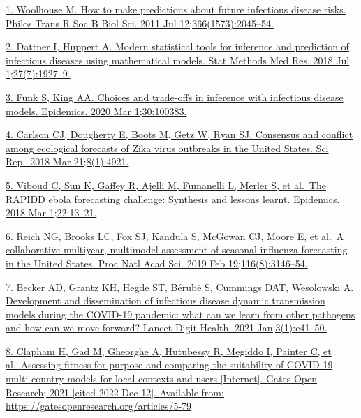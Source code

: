 \documentclass[
  letterpaper,
  DIV=11,
  numbers=noendperiod]{scrartcl}
\begin{document}
\begin{tcolorbox}[enhanced jigsaw, title=\textcolor{quarto-callout-caution-color}{\faFire}\hspace{0.5em}{Caution}, coltitle=black, colback=white, left=2mm, colbacktitle=quarto-callout-caution-color!10!white, breakable, bottomrule=.15mm, titlerule=0mm, opacityback=0, toprule=.15mm, rightrule=.15mm, arc=.35mm, toptitle=1mm, leftrule=.75mm, bottomtitle=1mm, opacitybacktitle=0.6, colframe=quarto-callout-caution-color-frame]

\href{https://www.zotero.org/google-docs/?7SKDbN}{1. Woolhouse M. How to
make predictions about future infectious disease risks. Philos Trans R
Soc B Biol Sci. 2011 Jul 12;366(1573):2045--54.}

\href{https://www.zotero.org/google-docs/?7SKDbN}{2. Dattner I, Huppert
A. Modern statistical tools for inference and prediction of infectious
diseases using mathematical models. Stat Methods Med Res. 2018 Jul
1;27(7):1927--9.}

\href{https://www.zotero.org/google-docs/?7SKDbN}{3. Funk S, King AA.
Choices and trade-offs in inference with infectious disease models.
Epidemics. 2020 Mar 1;30:100383.}

\href{https://www.zotero.org/google-docs/?7SKDbN}{4. Carlson CJ,
Dougherty E, Boots M, Getz W, Ryan SJ. Consensus and conflict among
ecological forecasts of Zika virus outbreaks in the United States. Sci
Rep.~2018 Mar 21;8(1):4921.}

\href{https://www.zotero.org/google-docs/?7SKDbN}{5. Viboud C, Sun K,
Gaffey R, Ajelli M, Fumanelli L, Merler S, et al.~The RAPIDD ebola
forecasting challenge: Synthesis and lessons learnt. Epidemics. 2018 Mar
1;22:13--21.}

\href{https://www.zotero.org/google-docs/?7SKDbN}{6. Reich NG, Brooks
LC, Fox SJ, Kandula S, McGowan CJ, Moore E, et al.~A collaborative
multiyear, multimodel assessment of seasonal influenza forecasting in
the United States. Proc Natl Acad Sci. 2019 Feb 19;116(8):3146--54.}

\href{https://www.zotero.org/google-docs/?7SKDbN}{7. Becker AD, Grantz
KH, Hegde ST, Bérubé S, Cummings DAT, Wesolowski A. Development and
dissemination of infectious disease dynamic transmission models during
the COVID-19 pandemic: what can we learn from other pathogens and how
can we move forward? Lancet Digit Health. 2021 Jan;3(1):e41--50.}

\href{https://www.zotero.org/google-docs/?7SKDbN}{8. Clapham H, Gad M,
Gheorghe A, Hutubessy R, Megiddo I, Painter C, et al.~Assessing
fitness-for-purpose and comparing the suitability of COVID-19
multi-country models for local contexts and users {[}Internet{]}. Gates
Open Research; 2021 {[}cited 2022 Dec 12{]}. Available from:
https://gatesopenresearch.org/articles/5-79}


\end{tcolorbox}
\end{document}
